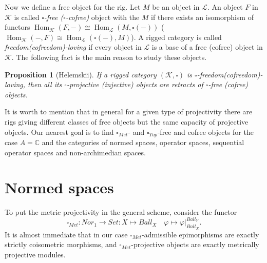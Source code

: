 \documentclass[a0b,landscape]{a0poster}
\newtheorem*{proposition}{Proposition}
\begin{document}
\begin{multicols}{4}
Now we define a free object for the rig. Let $M$ be an object in $\mathcal{L}$. An object $F$ in $\mathcal{K}$ is called \textit{$\square$-free ($\square$-cofree)}
object with the  $M$ if there exists an isomorphism of functors $\operatorname{Hom}_{\mathcal{K}}(F,-)\cong\operatorname{Hom}_{\mathcal{L}}(M,\square(-))$
($\operatorname{Hom}_{\mathcal{K}}(-,F)\cong\operatorname{Hom}_{\mathcal{L}}(\square(-),M)$). A rigged category is called \textit{freedom(cofreedom)-loving} if 
every object in $\mathcal{L}$ is a base of a free (cofree) object in $\mathcal{K}$. The following fact is the main reason to study these objects.

\begin{proposition}[Helemskii] If a rigged category $(\mathcal{K},\square)$ is $\square$-freedom(cofreedom)-loving, then all its
$\square$-projective (injective) objects are retracts of $\square$-free (cofree) objects.
\end{proposition}

It is worth to mention that in general for a given type of projectivity there are rigs giving different classes of free objects but the same capacity of projective objects.
Our nearest goal is to find $\square_{Met}$- and $\square_{Top}$-free and cofree objects for the case $A = \mathbb{C}$ and the categories of normed spaces, operator spaces,
sequential operator spaces and non-archimedian spaces.










\section*{Normed spaces}

To put the metric projectivity in the general scheme, consider the functor
$$
\square_{Met}:Nor_1\to Set: X\mapsto Ball_X\quad \varphi\mapsto \varphi|_{Ball_X}^{Ball_Y}.
$$
It is almost immediate that in our case $\square_{Met}$-admissible epimorphisms are exactly strictly coisometric morphisms, and $\square_{Met}$-projective objects are exactly
metrically projective modules.



\end{multicols}
\end{document}
